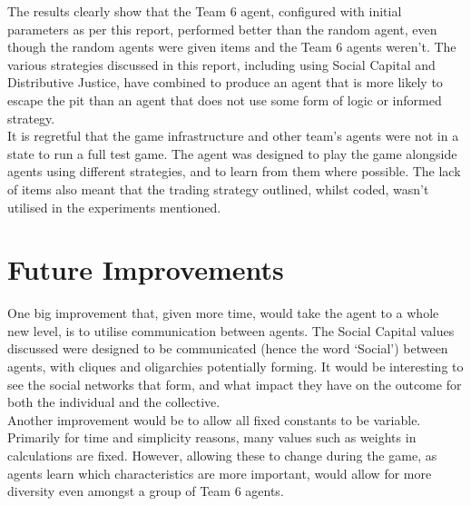 The results clearly show that the Team 6 agent, configured with initial parameters as per this report, performed better than the random agent, even though the random agents were given items and the Team 6 agents weren't. The various strategies discussed in this report, including using Social Capital and Distributive Justice, have combined to produce an agent that is more likely to escape the pit than an agent that does not use some form of logic or informed strategy.\\

It is regretful that the game infrastructure and other team's agents were not in a state to run a full test game. The agent was designed to play the game alongside agents using different strategies, and to learn from them where possible. The lack of items also meant that the trading strategy outlined, whilst coded, wasn't utilised in the experiments mentioned.

\section{Future Improvements}

One big improvement that, given more time, would take the agent to a whole new level, is to utilise communication between agents. The Social Capital values discussed were designed to be communicated (hence the word `Social') between agents, with cliques and oligarchies potentially forming. It would be interesting to see the social networks that form, and what impact they have on the outcome for both the individual and the collective.\\

Another improvement would be to allow all fixed constants to be variable. Primarily for time and simplicity reasons, many values such as weights in calculations are fixed. However, allowing these to change during the game, as agents learn which characteristics are more important, would allow for more diversity even amongst a group of Team 6 agents.
